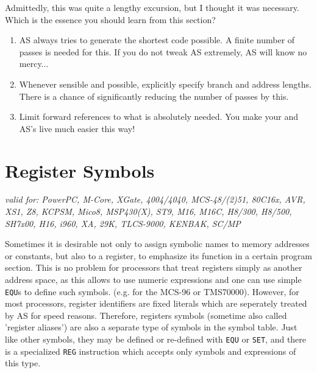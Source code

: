 \documentclass[12pt,twoside]{report}
\makeatletter
\newcommand{\tty}[1]{{\tt #1}}
\newcommand{\ttindex}[1]{\index{#1@{\tt #1}}}
\newcommand{\asname}{{AS}}
\makeatother
\begin{document}
Admittedly, this was quite a lengthy excursion, but I thought it was
necessary.  Which is the essence you should learn from this section?
\begin{enumerate}
\item{\asname{} always tries to generate the shortest code possible.  A
      finite number of passes is needed for this.  If you do not tweak
      \asname{} extremely, \asname{} will know no mercy...}
\item{Whenever sensible and possible, explicitly specify branch and
      address lengths.  There is a chance of significantly reducing the
      number of passes by this.}
\item{Limit forward references to what is absolutely needed.  You make
      your and \asname{}'s live much easier this way!}
\end{enumerate}


\section{Register Symbols}
\label{SectRegSyms} \ttindex{Register Symbols}

{\em valid for: PowerPC, M-Core, XGate, 4004/4040, MCS-48/(2)51, 80C16x,
     AVR, XS1, Z8, KCPSM, Mico8, MSP430(X), ST9, M16, M16C, H8/300,
     H8/500, SH7x00, H16, i960, XA, 29K, TLCS-9000, KENBAK, SC/MP}

Sometimes it is desirable not only to assign symbolic names to memory
addresses or constants, but also to a register, to emphasize its function
in a certain program section.  This is no problem for processors that
treat registers simply as another address space, as this allows to use
numeric expressions and one can use simple \tty{EQU}s to define such
symbols.  (e.g. for the MCS-96 or TMS70000).  However, for most
processors, register identifiers are fixed literals which are seperately
treated by \asname{} for speed reasons.  Therefore, registers symbols (sometime
also called 'register aliases') are also a separate type of symbols in
the symbol table.  Just like other symbols, they may be defined or re-defined
with \tty{EQU} or \tty{SET}, and there is a specialized \tty{REG} instruction
which accepts only symbols and expressions of this type.
\end{document}
